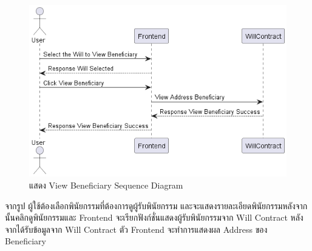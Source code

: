 \documentclass[12pt,oneside,openright,a4paper]{cpe-thai-project}
\begin{document}
\begin{enumerate}[label=\thesubsection.\arabic*,leftmargin=0pt,itemindent=1.25cm]
\begin{table}[h]
\begin{tabularx}{\textwidth}{|l|X|X|}
		\hline
		\end{tabularx}
	\end{table}
		\begin{figure}[!thb]
			\centering
			\includegraphics[scale=0.6]{viewBeneficiaryseq}
			\caption{แสดง View Beneficiary Sequence Diagram}
		\end{figure}
		\FloatBarrier
	\tab จากรูป ผู้ใช้ต้องเลือกพินัยกรรมที่ต้องการดูผู้รับพินัยกรรม และจะแสดงรายละเอียดพินัยกรรมหลังจากนั้นคลิกดูพินัยกรรมและ Frontend จะเรียกฟังก์ชั่นแสดงผู้รับพินัยกรรมจาก Will Contract หลังจากได้รับข้อมูลจาก Will Contract ตัว Frontend จะทำการแสดงผล Address ของ Beneficiary 
	

\end{enumerate}
\end{document}
